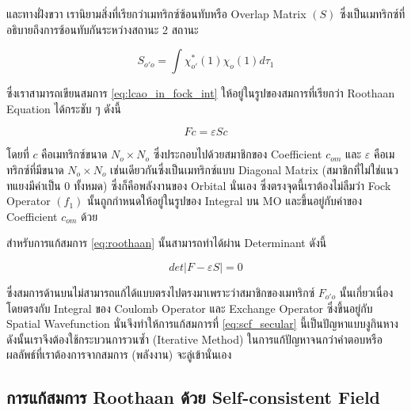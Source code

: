 \noindent และทางฝั่งขวา เรานิยามสิ่งที่เรียกว่าเมทริกซ์ซ้อนทับหรือ Overlap Matrix $(S)$ ซึ่งเป็นเมทริกซ์ที่อธิบายถึงการซ้อนทับกันระหว่างสถานะ 
2 สถานะ

\begin{equation}\label{eq:matrix_overlap}
    S_{o'o} = \int \chi^{*}_{o'}(1) \chi_{o}(1) d\tau_{1}
\end{equation}

\noindent ซึ่งเราสามารถเขียนสมการ \ref{eq:lcao_in_fock_int} ให้อยู่ในรูปของสมการที่เรียกว่า Roothaan Equation ได้กระชับ ๆ ดังนี้

\begin{equation}\label{eq:roothaan}
    F c = \varepsilon S c
\end{equation}

\noindent โดยที่ $c$ คือเมทริกซ์ขนาด $N_{o} \times N_{o}$ ซึ่งประกอบไปด้วยสมาชิกของ Coefficient $c_{om}$ และ $\varepsilon$ 
คือเมทริกซ์ที่มีขนาด $N_{o} \times N_{o}$ เช่นเดียวกันซึ่งเป็นเมทริกซ์แบบ Diagonal Matrix (สมาชิกที่ไม่ใช่แนวทแยงมีค่าเป็น 0 ทั้งหมด) 
ซึ่งก็คือพลังงานของ Orbital นั่นเอง ซึ่งตรงจุดนี้เราต้องไม่ลืมว่า Fock Operator $(f_{1})$ นั้นถูกกำหนดให้อยู่ในรูปของ Integral บน MO 
และขึ้นอยู่กับค่าของ Coefficient $c_{om}$ ด้วย

สำหรับการแก้สมการ \ref{eq:roothaan} นั้นสามารถทำได้ผ่าน Determinant ดังนี้

\begin{equation}\label{eq:scf_secular}
    det|F - \varepsilon S| = 0
\end{equation}

\noindent ซึ่งสมการด้านบนไม่สามารถแก้ได้แบบตรงไปตรงมาเพราะว่าสมาชิกของเมทริกซ์ $F_{o'o}$ นั้นเกี่ยวเนื่องโดยตรงกับ Integral ของ 
Coulomb Operator และ Exchange Operator ซึ่งขึ้นอยู่กับ Spatial Wavefunction นั่นจึงทำให้การแก้สมการที่ \ref{eq:scf_secular} 
นี้เป็นปัญหาแบบงูกินหาง ดังนั้นเราจึงต้องใช้กระบวนการวนซ้ำ (Iterative Method) ในการแก้ปัญหาจนกว่าคำตอบหรือผลลัพธ์ที่เราต้องการจากสมการ 
(พลังงาน) จะลู่เข้านั่นเอง

\subsection{การแก้สมการ Roothaan ด้วย Self-consistent Field}
\label{ssec:roothaan_scf}

